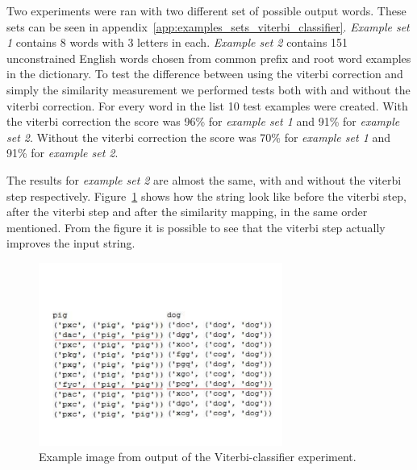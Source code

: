  Two experiments were ran with two different set of possible output words.
 These sets can be seen in appendix~\ref{app:examples_sets_viterbi_classifier}.
 \emph{Example set 1} contains 8 words with 3 letters in each.
 \emph{Example set 2} contains 151 unconstrained English words chosen from common prefix and root word examples in the dictionary.
 To test the difference between using the viterbi correction and simply the similarity measurement we performed tests both with and without the viterbi correction.
 For every word in the list 10 test examples were created.
 With the viterbi correction the score was 96\% for \emph{example set 1} and 91\% for \emph{example set 2}.
 Without the viterbi correction the score was 70\% for \emph{example set 1} and 91\% for \emph{example set 2}.

 The results for \emph{example set 2} are almost the same, with and without the viterbi step respectively.
 Figure~\ref{fig:viterbifig} shows how the string look like before the viterbi step, after the viterbi step and after the similarity mapping, in the same order mentioned.
 From the figure it is possible to see that the viterbi step actually improves the input string.

    \begin{figure}[htb] 
      \begin{center}
	\leavevmode
	\includegraphics[width=80mm]{viterbiimage.pdf}%
      \end{center}
      \caption{Example image from output of the Viterbi-classifier experiment.}
      \label{fig:viterbifig}
    \end{figure}






